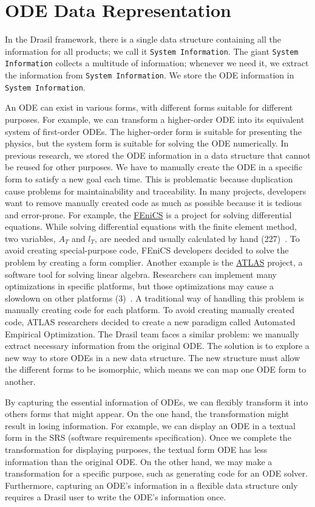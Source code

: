 \chapter{ODE Data Representation}
In the Drasil framework, there is a single data structure containing all the information for all products; we call it \verb|System Information|. The giant \verb|System Information| collects a multitude of information; whenever we need it, we extract the information from \verb|System Information|. We store the ODE information in \verb|System Information|. 

An ODE can exist in various forms, with different forms suitable for different purposes. For example, we can transform a higher-order ODE into its equivalent system of first-order ODEs. The higher-order form is suitable for presenting the physics, but the system form is suitable for solving the ODE numerically. In previous research, we stored the ODE information in a data structure that cannot be reused for other purposes. We have to manually create the ODE in a specific form to satisfy a new goal each time. This is problematic because duplication cause problems for maintainability and traceability. In many projects, developers want to remove manually created code as much as possible because it is tedious and error-prone. For example, the \href{https://fenicsproject.org/}{FEniCS} is a project for solving differential equations. While solving differential equations with the finite element method, two variables, $A_T$ and $l_T$, are needed and usually calculated by hand (227)~\citep{loggetal2012}. To avoid creating special-purpose code, FEniCS developers decided to solve the problem by creating a form complier. Another example is the \href{https://math-atlas.sourceforge.net/}{ATLAS} project, a software tool for solving linear algebra. Researchers can implement many optimizations in specific platforms, but those optimizations may cause a slowdown on other platforms (3)~\citep{whaleyetal2001}. A traditional way of handling this problem is manually creating code for each platform. To avoid creating manually created code, ATLAS researchers decided to create a new paradigm called Automated Empirical Optimization. The Drasil team faces a similar problem: we manually extract necessary information from the original ODE. The solution is to explore a new way to store ODEs in a new data structure. The new structure must allow the different forms to be isomorphic, which means we can map one ODE form to another.

By capturing the essential information of ODEs, we can flexibly transform it into others forms that might appear. On the one hand, the transformation might result in losing information. For example, we can display an ODE in a textual form in the SRS (software requirements specification). Once we complete the transformation for displaying purposes, the textual form ODE has less information than the original ODE. On the other hand, we may make a transformation for a specific purpose, such as generating code for an ODE solver. Furthermore, capturing an ODE's information in a flexible data structure only requires a Drasil user to write the ODE's information once.

